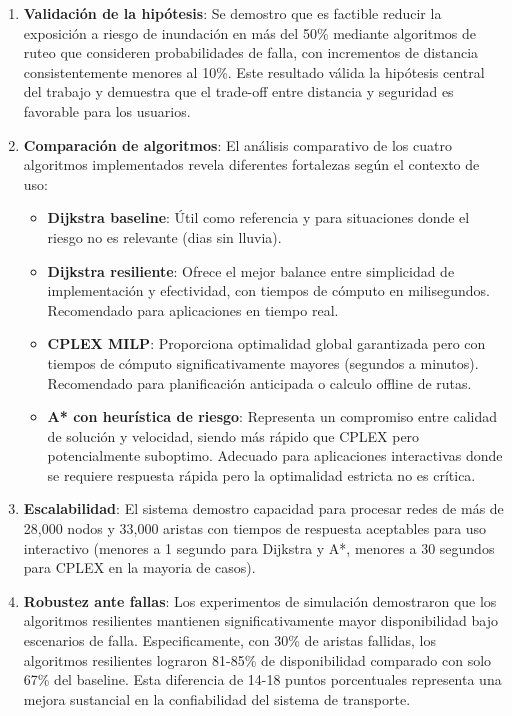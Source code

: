 \documentclass[conference]{IEEEtran}
\begin{document}
\begin{enumerate}
    \item \textbf{Validación de la hipótesis}: Se demostro que es factible reducir la exposición a riesgo de inundación en más del 50\% mediante algoritmos de ruteo que consideren probabilidades de falla, con incrementos de distancia consistentemente menores al 10\%. Este resultado válida la hipótesis central del trabajo y demuestra que el trade-off entre distancia y seguridad es favorable para los usuarios.

    \item \textbf{Comparación de algoritmos}: El análisis comparativo de los cuatro algoritmos implementados revela diferentes fortalezas según el contexto de uso:
    \begin{itemize}
        \item \textbf{Dijkstra baseline}: Útil como referencia y para situaciones donde el riesgo no es relevante (dias sin lluvia).
        \item \textbf{Dijkstra resiliente}: Ofrece el mejor balance entre simplicidad de implementación y efectividad, con tiempos de cómputo en milisegundos. Recomendado para aplicaciones en tiempo real.
        \item \textbf{CPLEX MILP}: Proporciona optimalidad global garantizada pero con tiempos de cómputo significativamente mayores (segundos a minutos). Recomendado para planificación anticipada o calculo offline de rutas.
        \item \textbf{A* con heurística de riesgo}: Representa un compromiso entre calidad de solución y velocidad, siendo más rápido que CPLEX pero potencialmente suboptimo. Adecuado para aplicaciones interactivas donde se requiere respuesta rápida pero la optimalidad estricta no es crítica.
    \end{itemize}

    \item \textbf{Escalabilidad}: El sistema demostro capacidad para procesar redes de más de 28,000 nodos y 33,000 aristas con tiempos de respuesta aceptables para uso interactivo (menores a 1 segundo para Dijkstra y A*, menores a 30 segundos para CPLEX en la mayoria de casos).

    \item \textbf{Robustez ante fallas}: Los experimentos de simulación demostraron que los algoritmos resilientes mantienen significativamente mayor disponibilidad bajo escenarios de falla. Especificamente, con 30\% de aristas fallidas, los algoritmos resilientes lograron 81-85\% de disponibilidad comparado con solo 67\% del baseline. Esta diferencia de 14-18 puntos porcentuales representa una mejora sustancial en la confiabilidad del sistema de transporte.


\end{enumerate}
\end{document}
